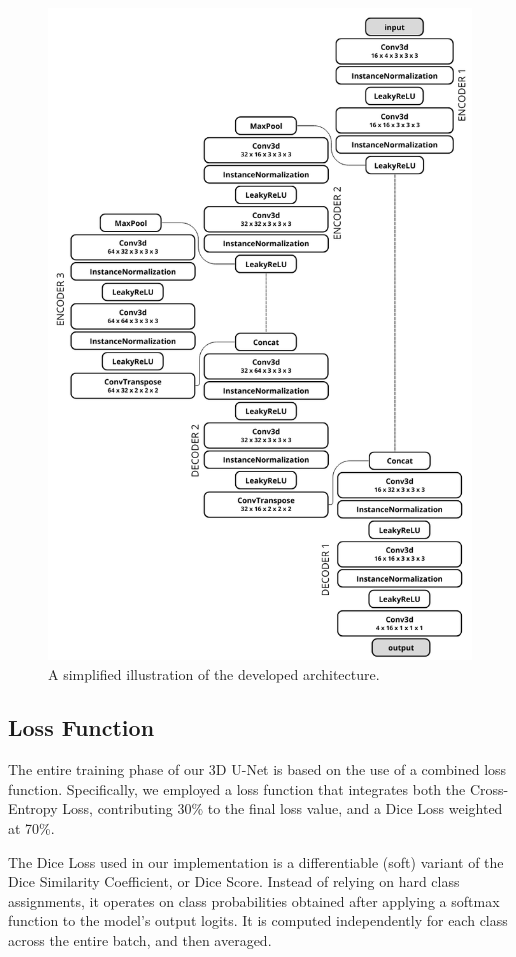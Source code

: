 \documentclass[10pt,twocolumn,letterpaper]{article}
\begin{document}
\begin{figure}
    \centering
    \includegraphics[width=0.8\linewidth]{img/architect.png}
    \caption{A simplified illustration of the developed architecture.}
\end{figure}


\subsection{Loss Function} \label{loss_function}
The entire training phase of our 3D U-Net is based on the use of a combined loss function. Specifically, we employed a loss function that integrates both the Cross-Entropy Loss, contributing 30\% to the final loss value, and a Dice Loss weighted at 70\%.

The Dice Loss used in our implementation is a differentiable (soft) variant of the Dice Similarity Coefficient, or Dice Score. Instead of relying on hard class assignments, it operates on class probabilities obtained after applying a softmax function to the model’s output logits. It is computed independently for each class across the entire batch, and then averaged.
\end{document}

